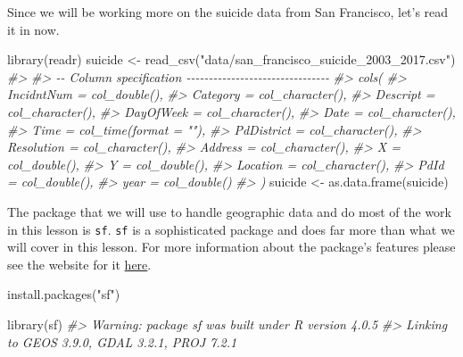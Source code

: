 \documentclass[
  12pt,
  openany]{book}
\newenvironment{Shaded}{\begin{snugshade}}{\end{snugshade}}
\newcommand{\CommentTok}[1]{\textcolor[rgb]{0.37,0.37,0.37}{\textit{#1}}}
\newcommand{\FunctionTok}[1]{\textcolor[rgb]{0,0,0}{#1}}
\newcommand{\NormalTok}[1]{#1}
\newcommand{\OtherTok}[1]{\textcolor[rgb]{0.37,0.37,0.37}{#1}}
\newcommand{\StringTok}[1]{\textcolor[rgb]{0.5,0.5,0.5}{#1}}
\begin{document}
Since we will be working more on the suicide data from San Francisco, let's read it in now.

\begin{Shaded}
\begin{Highlighting}[]
\FunctionTok{library}\NormalTok{(readr)}
\NormalTok{suicide }\OtherTok{\textless{}{-}} \FunctionTok{read\_csv}\NormalTok{(}\StringTok{"data/san\_francisco\_suicide\_2003\_2017.csv"}\NormalTok{)}
\CommentTok{\#\textgreater{} }
\CommentTok{\#\textgreater{} {-}{-} Column specification {-}{-}{-}{-}{-}{-}{-}{-}{-}{-}{-}{-}{-}{-}{-}{-}{-}{-}{-}{-}{-}{-}{-}{-}{-}{-}{-}{-}{-}{-}{-}{-}}
\CommentTok{\#\textgreater{} cols(}
\CommentTok{\#\textgreater{}   IncidntNum = col\_double(),}
\CommentTok{\#\textgreater{}   Category = col\_character(),}
\CommentTok{\#\textgreater{}   Descript = col\_character(),}
\CommentTok{\#\textgreater{}   DayOfWeek = col\_character(),}
\CommentTok{\#\textgreater{}   Date = col\_character(),}
\CommentTok{\#\textgreater{}   Time = col\_time(format = ""),}
\CommentTok{\#\textgreater{}   PdDistrict = col\_character(),}
\CommentTok{\#\textgreater{}   Resolution = col\_character(),}
\CommentTok{\#\textgreater{}   Address = col\_character(),}
\CommentTok{\#\textgreater{}   X = col\_double(),}
\CommentTok{\#\textgreater{}   Y = col\_double(),}
\CommentTok{\#\textgreater{}   Location = col\_character(),}
\CommentTok{\#\textgreater{}   PdId = col\_double(),}
\CommentTok{\#\textgreater{}   year = col\_double()}
\CommentTok{\#\textgreater{} )}
\NormalTok{suicide }\OtherTok{\textless{}{-}} \FunctionTok{as.data.frame}\NormalTok{(suicide)}
\end{Highlighting}
\end{Shaded}

The package that we will use to handle geographic data and do most of the work in this lesson is \texttt{sf}. \texttt{sf} is a sophisticated package and does far more than what we will cover in this lesson. For more information about the package's features please see the website for it \href{http://r-spatial.github.io/sf/}{here}.

\begin{Shaded}
\begin{Highlighting}[]
\FunctionTok{install.packages}\NormalTok{(}\StringTok{"sf"}\NormalTok{)}
\end{Highlighting}
\end{Shaded}

\begin{Shaded}
\begin{Highlighting}[]
\FunctionTok{library}\NormalTok{(sf)}
\CommentTok{\#\textgreater{} Warning: package \textquotesingle{}sf\textquotesingle{} was built under R version 4.0.5}
\CommentTok{\#\textgreater{} Linking to GEOS 3.9.0, GDAL 3.2.1, PROJ 7.2.1}
\end{Highlighting}
\end{Shaded}
\end{document}

